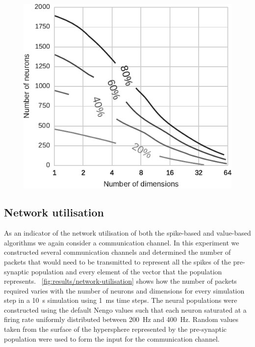 \documentclass[conference]{IEEEtran}
\begin{document}
  \begin{figure}[!t]
    \includegraphics{figures/comm_channel_cpu_contour}
    \caption{}
    \label{fig:results/comm-channel-cpu-contour}
  \end{figure}
  
  \subsection{Network utilisation}

  As an indicator of the network utilisation of both the spike-based and value-based algorithms we again consider a communication channel.
  In this experiment we constructed several communication channels and determined the number of packets that would need to be transmitted to represent all the spikes of the pre-synaptic population and every element of the vector that the population represents.
  \figurename~\ref{fig:results/network-utilisation} shows how the number of packets required varies with the number of neurons and dimensions for every simulation step in a \SI{10}{\second} simulation using \SI{1}{\milli\second} time steps.
  The neural populations were constructed using the default Nengo values such that each neuron saturated at a firing rate uniformly distributed between \SI{200}{\hertz} and \SI{400}{\hertz}.
  Random values taken from the surface of the hypersphere represented by the pre-synaptic population were used to form the input for the communication channel.
\end{document}
